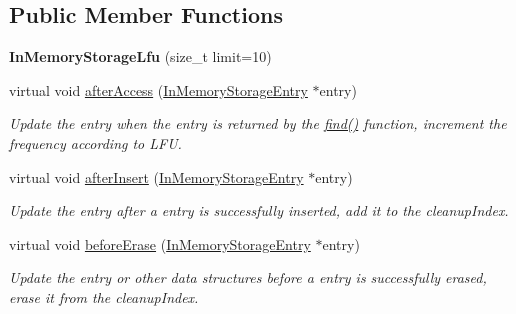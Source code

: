 \subsection*{Public Member Functions}
\begin{DoxyCompactItemize}
\item 
{\bfseries In\+Memory\+Storage\+Lfu} (size\+\_\+t limit=10)\hypertarget{classndn_1_1util_1_1InMemoryStorageLfu_a7823e5eb23d547c65b0ff9de7468d09e}{}\label{classndn_1_1util_1_1InMemoryStorageLfu_a7823e5eb23d547c65b0ff9de7468d09e}

\item 
virtual void \hyperlink{classndn_1_1util_1_1InMemoryStorageLfu_a9b19f13d5729fcc621b504a653e1f5fd}{after\+Access} (\hyperlink{classndn_1_1util_1_1InMemoryStorageEntry}{In\+Memory\+Storage\+Entry} $\ast$entry)\hypertarget{classndn_1_1util_1_1InMemoryStorageLfu_a9b19f13d5729fcc621b504a653e1f5fd}{}\label{classndn_1_1util_1_1InMemoryStorageLfu_a9b19f13d5729fcc621b504a653e1f5fd}

\begin{DoxyCompactList}\small\item\em Update the entry when the entry is returned by the \hyperlink{classndn_1_1util_1_1InMemoryStorage_a01ee745af540a1d99b5a18c5722d50c5}{find()} function, increment the frequency according to L\+FU. \end{DoxyCompactList}\item 
virtual void \hyperlink{classndn_1_1util_1_1InMemoryStorageLfu_a0a3d29c447660b16fd98acfef8999b94}{after\+Insert} (\hyperlink{classndn_1_1util_1_1InMemoryStorageEntry}{In\+Memory\+Storage\+Entry} $\ast$entry)\hypertarget{classndn_1_1util_1_1InMemoryStorageLfu_a0a3d29c447660b16fd98acfef8999b94}{}\label{classndn_1_1util_1_1InMemoryStorageLfu_a0a3d29c447660b16fd98acfef8999b94}

\begin{DoxyCompactList}\small\item\em Update the entry after a entry is successfully inserted, add it to the cleanup\+Index. \end{DoxyCompactList}\item 
virtual void \hyperlink{classndn_1_1util_1_1InMemoryStorageLfu_aa4db4697ec1e382cf0ec8d8d875d8181}{before\+Erase} (\hyperlink{classndn_1_1util_1_1InMemoryStorageEntry}{In\+Memory\+Storage\+Entry} $\ast$entry)\hypertarget{classndn_1_1util_1_1InMemoryStorageLfu_aa4db4697ec1e382cf0ec8d8d875d8181}{}\label{classndn_1_1util_1_1InMemoryStorageLfu_aa4db4697ec1e382cf0ec8d8d875d8181}

\begin{DoxyCompactList}\small\item\em Update the entry or other data structures before a entry is successfully erased, erase it from the cleanup\+Index. \end{DoxyCompactList}\end{DoxyCompactItemize}
